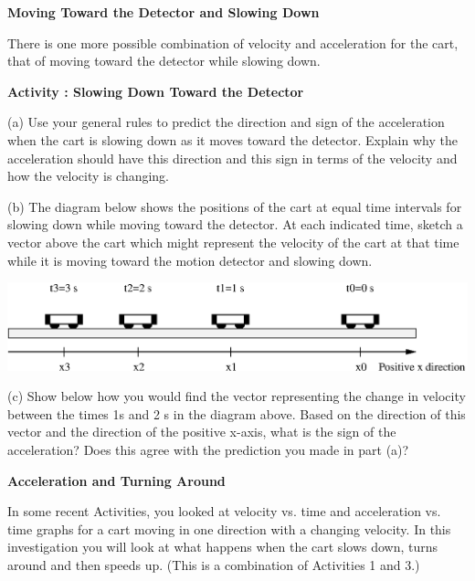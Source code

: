 \textbf{Moving Toward the Detector and Slowing Down }

There is one more possible combination of velocity and acceleration for the
cart, that of moving toward the detector while slowing down. 

\textbf{Activity : Slowing Down Toward the Detector}

(a) Use your general rules to predict the direction and sign of the acceleration
when the cart is slowing down as it moves toward the detector. Explain why the
acceleration should have this direction and this sign in terms of the velocity
and how the velocity is changing. 
\vspace{20mm}

(b) The diagram below shows the positions of the cart at equal time intervals
for slowing down while moving toward the detector. At each indicated time, sketch
a vector above the cart which might represent the velocity of the cart at that
time while it is moving toward the motion detector and slowing down.

\vspace{0.3cm}
{\par\centering \includegraphics{slowing/slowing_fig4.eps} \par}
\vspace{0.3cm}

\newpage %

(c) Show below how you would find the vector representing the change in velocity
between the times 1s and 2 s in the diagram above. Based on the direction of
this vector and the direction of the positive x-axis, what is the sign of the
acceleration? Does this agree with the prediction you made in part (a)?
\vspace{15mm}

\textbf{Acceleration and Turning Around }

In some recent Activities, you looked at
velocity vs. time and acceleration vs. time graphs for a cart moving in one
direction with a changing velocity. In this investigation you will look at what
happens when the cart slows down, turns around and then speeds up. (This is a
combination of Activities 1 and 3.)

